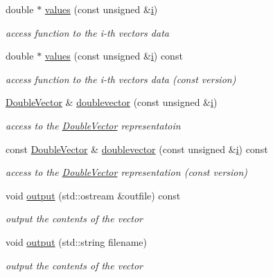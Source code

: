\begin{DoxyCompactItemize}
double $\ast$ \hyperlink{classoomph_1_1DoubleMultiVector_a1c6ed33851839407108fd33650d332cb}{values} (const unsigned \&\hyperlink{cfortran_8h_adb50e893b86b3e55e751a42eab3cba82}{i})
\begin{DoxyCompactList}\small\item\em access function to the i-\/th vector\textquotesingle{}s data \end{DoxyCompactList}\item 
double $\ast$ \hyperlink{classoomph_1_1DoubleMultiVector_a8590d3a32b972e5ef0a2f801cd6cd80b}{values} (const unsigned \&\hyperlink{cfortran_8h_adb50e893b86b3e55e751a42eab3cba82}{i}) const
\begin{DoxyCompactList}\small\item\em access function to the i-\/th vector\textquotesingle{}s data (const version) \end{DoxyCompactList}\item 
\hyperlink{classoomph_1_1DoubleVector}{Double\+Vector} \& \hyperlink{classoomph_1_1DoubleMultiVector_a9ec00020512cc85190a754332ed00cb7}{doublevector} (const unsigned \&\hyperlink{cfortran_8h_adb50e893b86b3e55e751a42eab3cba82}{i})
\begin{DoxyCompactList}\small\item\em access to the \hyperlink{classoomph_1_1DoubleVector}{Double\+Vector} representatoin \end{DoxyCompactList}\item 
const \hyperlink{classoomph_1_1DoubleVector}{Double\+Vector} \& \hyperlink{classoomph_1_1DoubleMultiVector_acac28efef0b5f55c715d1893a5dca3d5}{doublevector} (const unsigned \&\hyperlink{cfortran_8h_adb50e893b86b3e55e751a42eab3cba82}{i}) const
\begin{DoxyCompactList}\small\item\em access to the \hyperlink{classoomph_1_1DoubleVector}{Double\+Vector} representation (const version) \end{DoxyCompactList}\item 
void \hyperlink{classoomph_1_1DoubleMultiVector_a0dbfe401ddb32b128f01fd3bb4755c4f}{output} (std\+::ostream \&outfile) const
\begin{DoxyCompactList}\small\item\em output the contents of the vector \end{DoxyCompactList}\item 
void \hyperlink{classoomph_1_1DoubleMultiVector_ae465b1dd1100941eb39e7604cab5175d}{output} (std\+::string filename)
\begin{DoxyCompactList}\small\item\em output the contents of the vector \end{DoxyCompactList}\item 

\end{DoxyCompactItemize}
